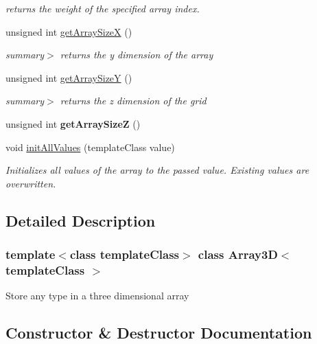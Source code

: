 \begin{DoxyCompactItemize}
\begin{DoxyCompactList}\small\item\em returns the weight of the specified array index. \end{DoxyCompactList}\item 
unsigned int \hyperlink{class_array3_d_a5c406bcb6868cb65acb6ac1f593d743e}{get\+Array\+SizeX} ()
\begin{DoxyCompactList}\small\item\em summary$>$ returns the y dimension of the array\end{DoxyCompactList}\item 
unsigned int \hyperlink{class_array3_d_a1d60c3290d17e30e1e5854f296bba68b}{get\+Array\+SizeY} ()
\begin{DoxyCompactList}\small\item\em summary$>$ returns the z dimension of the grid\end{DoxyCompactList}\item 
\mbox{\label{class_array3_d_a6223fa080e3dfef08b48f893fad066ad}} 
unsigned int {\bfseries get\+Array\+SizeZ} ()
\item 
void \hyperlink{class_array3_d_a0bc535dddbd5c2e5597fc967aa0e4a0e}{init\+All\+Values} (template\+Class value)
\begin{DoxyCompactList}\small\item\em Initializes all values of the array to the passed value. Existing values are overwritten. \end{DoxyCompactList}\end{DoxyCompactItemize}


\subsection{Detailed Description}
\subsubsection*{template$<$class template\+Class$>$\newline
class Array3\+D$<$ template\+Class $>$}

Store any type in a three dimensional array



\subsection{Constructor \& Destructor Documentation}
\mbox{\label{class_array3_d_a86765d4b26c76555b35279d42a69158a}} 
